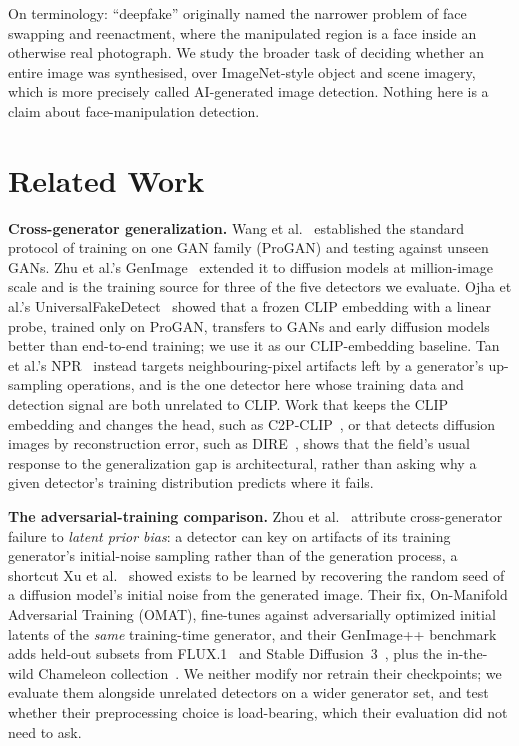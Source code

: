 \documentclass[3p,times,procedia]{elsarticle}
\begin{document}
On terminology: ``deepfake'' originally named the narrower problem of face
swapping and reenactment, where the manipulated region is a face inside an
otherwise real photograph. We study the broader task of deciding whether
an entire image was synthesised, over ImageNet-style object and scene
imagery, which is more precisely called AI-generated image detection.
Nothing here is a claim about face-manipulation detection.

\section{Related Work}
\label{sec:related}

\textbf{Cross-generator generalization.} Wang et al.~\cite{wang2020cnndetect}
established the standard protocol of training on one GAN family (ProGAN)
and testing against unseen GANs. Zhu et al.'s GenImage~\cite{genimage2023}
extended it to diffusion models at million-image scale and is the training
source for three of the five detectors we evaluate. Ojha et al.'s
UniversalFakeDetect~\cite{ojha2023universal} showed that a frozen CLIP
embedding with a linear probe, trained only on ProGAN, transfers to GANs
and early diffusion models better than end-to-end training; we use it as
our CLIP-embedding baseline. Tan et al.'s NPR~\cite{tan2024npr} instead
targets neighbouring-pixel artifacts left by a generator's up-sampling
operations, and is the one detector here whose training data and detection
signal are both unrelated to CLIP. Work that keeps the CLIP embedding and
changes the head, such as C2P-CLIP~\cite{tan2025c2pclip}, or that detects
diffusion images by reconstruction error, such as
DIRE~\cite{wang2023dire}, shows that the field's usual response to the
generalization gap is architectural, rather than asking why a given
detector's training distribution predicts where it fails.

\textbf{The adversarial-training comparison.} Zhou et al.~\cite{zhou2025omat}
attribute cross-generator failure to \emph{latent prior bias}: a detector
can key on artifacts of its training generator's initial-noise sampling
rather than of the generation process, a shortcut Xu et
al.~\cite{xu2025seed} showed exists to be learned by recovering the random
seed of a diffusion model's initial noise from the generated image. Their
fix, On-Manifold Adversarial Training (OMAT), fine-tunes against
adversarially optimized initial latents of the \emph{same} training-time
generator, and their GenImage++ benchmark adds held-out subsets from
FLUX.1~\cite{flux2024} and Stable Diffusion~3~\cite{esser2024sd3}, plus
the in-the-wild Chameleon collection~\cite{yan2024chameleon}. We neither
modify nor retrain their checkpoints; we evaluate them alongside unrelated
detectors on a wider generator set, and test whether their preprocessing
choice is load-bearing, which their evaluation did not need to ask.
\end{document}
